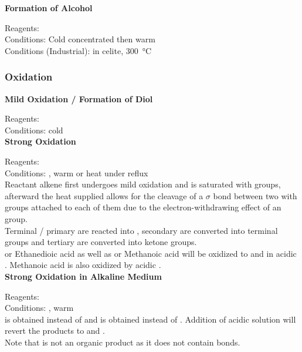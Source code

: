 \documentclass[../main]{subfiles}
\begin{document}
	\noindent \textbf{Formation of Alcohol}

	Reagents:  \\
	Conditions: Cold concentrated  then warm  \\
	Conditions (Industrial):  in celite, \SI{300}{\celsius} \\

	\subsubsection{Oxidation}

	\noindent \textbf{Mild Oxidation / Formation of Diol}

	Reagents: \\
	Conditions:  cold \\

	\noindent \textbf{Strong Oxidation}

	Reagents: \\
	Conditions: , warm or heat under reflux \\

	Reactant alkene first undergoes mild oxidation and is saturated with  groups, afterward the heat supplied allows for the cleavage of a \(\sigma\) bond between two  with  groups attached to each of them due to the electron-withdrawing effect of an  group. \\

	Terminal / primary  are reacted into , secondary  are converted into terminal  groups and tertiary  are converted into ketone groups. \\

	 or Ethanedioic acid as well as  or Methanoic acid will be oxidized to  and  in acidic . Methanoic acid is also oxidized by acidic . \\

	\noindent \textbf{Strong Oxidation in Alkaline Medium}

	Reagents:  \\
	Conditions: , warm \\

	 is obtained instead of  and  is obtained instead of . Addition of acidic solution will revert the products to  and . \\

	Note that  is not an organic product as it does not contain  bonds.
\end{document}

